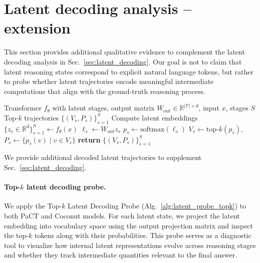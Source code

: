 \section{Latent decoding analysis -- extension}
\label{app:latent_decoding_examples}

This section provides additional qualitative evidence to complement the latent decoding analysis in Sec.~\ref{sec:latent_decoding}. Our goal is not to claim that latent reasoning states correspond to explicit natural language tokens, but rather to probe whether latent trajectories encode meaningful intermediate computations that align with the ground-truth reasoning process.

\begin{algorithm}[h ]
\caption{Top-$k$ Latent Decoding Probe for PaCT/Coconut ($k{=}5$)}
\label{alg:latent_probe_topk}
\begin{algorithmic}[1]
\Require Transformer $f_{\theta}$ with latent stages, output matrix $W_{\text{out}} \in \mathbb{R}^{|\mathcal{V}|\times d}$, input $x$, stages $S$
\Ensure Top-$k$ trajectories $\{(V_s, P_s)\}_{s=1}^{S}$
\State Compute latent embeddings $\{z_s \in \mathbb{R}^d\}_{s=1}^{S} \leftarrow f_{\theta}(x)$
    \State $\ell_s \leftarrow W_{\text{out}} z_s$
    \State $p_s \leftarrow \text{softmax}(\ell_s)$
    \State $V_s \leftarrow \text{top-}k(p_s)$, $P_s \leftarrow \{p_s(v) \mid v \in V_s\}$
\EndFor
\State \textbf{return} $\{(V_s, P_s)\}_{s=1}^{S}$
\end{algorithmic}
\end{algorithm}

We provide additional decoded latent trajectories to supplement Sec.~\ref{sec:latent_decoding}.


\paragraph{Top-$k$ latent decoding probe.}
We apply the Top-$k$ Latent Decoding Probe (Alg.~\ref{alg:latent_probe_topk}) to both PaCT and Coconut models. For each latent state, we project the latent embedding into vocabulary space using the output projection matrix and inspect the top-$k$ tokens along with their probabilities. This probe serves as a diagnostic tool to visualize how internal latent representations evolve across reasoning stages and whether they track intermediate quantities relevant to the final answer.

